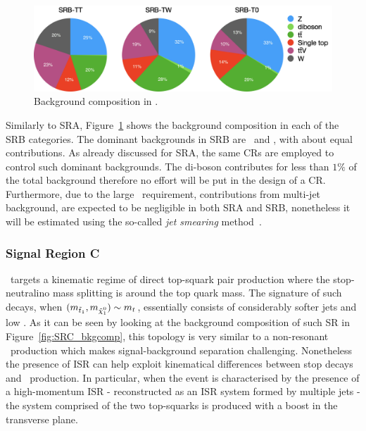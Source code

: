 				\begin{figure}[t]
				  \begin{center}
				   \includegraphics[width=\textwidth]{figures/stop/piechart_SRBcomp}
				   \caption{Background composition in \SRB.}
				   \label{fig:SRB_bkgcomp}
				  \end{center}
				\end{figure}

				Similarly to SRA, Figure~\ref{fig:SRB_bkgcomp} shows the background composition in each of the SRB categories. The dominant backgrounds in SRB are \Zjets\ and \ttbar, with about equal contributions. As already discussed for SRA, the same \acp{CR} are employed to control such dominant backgrounds. The di-boson contributes for less than $1\%$ of the total background therefore no effort will be put in the design of a \ac{CR}. Furthermore, due to the large \met\ requirement, contributions from multi-jet background, are expected to be negligible in both SRA and SRB, nonetheless it will be estimated using the so-called \emph{jet smearing} method~\cite{calumThesis}.




			\subsubsection*{Signal Region C}

				\SRC\ targets a kinematic regime of direct top-squark pair production where the stop-neutralino mass splitting is around the top quark mass. The signature of such decays, when $(\mstopone, \mninoone) \sim m_t$, essentially consists of considerably softer jets and low \met. As it can be seen by looking at the background composition of such \ac{SR} in Figure~\ref{fig:SRC_bkgcomp}, this topology is very similar to a non-resonant \ttbar\ production which makes signal-background separation challenging. Nonetheless the presence of \ac{ISR} can help exploit kinematical differences between stop decays and \ttbar\ production. In particular, when the event is characterised by the presence of a high-momentum \ac{ISR} - reconstructed as an \ac{ISR} system formed by multiple jets - the system comprised of the two top-squarks is produced with a boost in the transverse plane.

